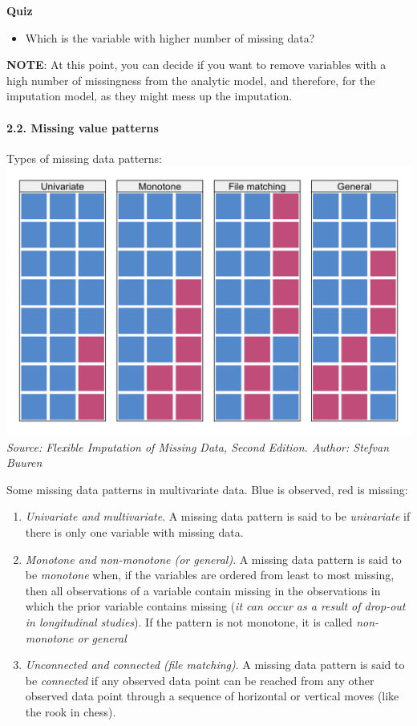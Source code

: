 \documentclass[
]{article}
\providecommand{\tightlist}{%
  \setlength{\itemsep}{0pt}\setlength{\parskip}{0pt}}
\begin{document}
\textbf{Quiz}

\begin{itemize}
\tightlist
\item
  Which is the variable with higher number of missing data?
\end{itemize}

\textbf{NOTE}: At this point, you can decide if you want to remove
variables with a high number of missingness from the analytic model, and
therefore, for the imputation model, as they might mess up the
imputation.

\hypertarget{missing-value-patterns}{%
\paragraph{2.2. Missing value patterns}\label{missing-value-patterns}}

Types of missing data
patterns:\href{https://stefvanbuuren.name/fimd/about-the-author.html}{\includegraphics[width=6.54167in,height=\textheight]{images/missing value patterns.png}}\\
\emph{Source: Flexible Imputation of Missing Data, Second Edition.
Author: Stefvan Buuren}

Some missing data patterns in multivariate data. Blue is observed, red
is missing:

\begin{enumerate}
\def\labelenumi{\arabic{enumi}.}
\tightlist
\item
  \emph{Univariate and multivariate}. A missing data pattern is said to
  be \emph{univariate} if there is only one variable with missing data.
\item
  \emph{Monotone and non-monotone (or general)}. A missing data pattern
  is said to be \emph{monotone} when, if the variables are ordered from
  least to most missing, then all observations of a variable contain
  missing in the observations in which the prior variable contains
  missing (\emph{it can occur as a result of drop-out in longitudinal
  studies}). If the pattern is not monotone, it is called
  \emph{non-monotone or general}
\item
  \emph{Unconnected and connected (file matching)}. A missing data
  pattern is said to be \emph{connected} if any observed data point can
  be reached from any other observed data point through a sequence of
  horizontal or vertical moves (like the rook in chess).
\end{enumerate}
\end{document}
